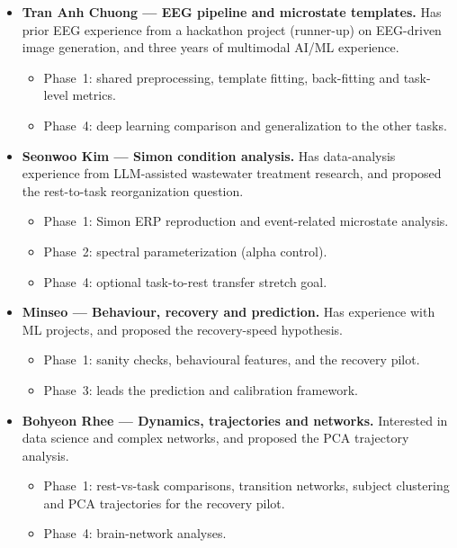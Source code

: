 \documentclass[11pt,a4paper]{article}
\begin{document}
\begin{itemize}
  \item \textbf{Tran Anh Chuong --- EEG pipeline and microstate templates.} Has prior EEG experience from a hackathon project (runner-up) on EEG-driven image generation, and three years of multimodal AI/ML experience.
  \begin{itemize}
    \item Phase~1: shared preprocessing, template fitting, back-fitting and task-level metrics.
    \item Phase~4: deep learning comparison and generalization to the other tasks.
  \end{itemize}
  \item \textbf{Seonwoo Kim --- Simon condition analysis.} Has data-analysis experience from LLM-assisted wastewater treatment research, and proposed the rest-to-task reorganization question.
  \begin{itemize}
    \item Phase~1: Simon ERP reproduction and event-related microstate analysis.
    \item Phase~2: spectral parameterization (alpha control).
    \item Phase~4: optional task-to-rest transfer stretch goal.
  \end{itemize}
  \item \textbf{Minseo --- Behaviour, recovery and prediction.} Has experience with ML projects, and proposed the recovery-speed hypothesis.
  \begin{itemize}
    \item Phase~1: sanity checks, behavioural features, and the recovery pilot.
    \item Phase~3: leads the prediction and calibration framework.
  \end{itemize}
  \item \textbf{Bohyeon Rhee --- Dynamics, trajectories and networks.} Interested in data science and complex networks, and proposed the PCA trajectory analysis.
  \begin{itemize}
    \item Phase~1: rest-vs-task comparisons, transition networks, subject clustering and PCA trajectories for the recovery pilot.
    \item Phase~4: brain-network analyses.
  \end{itemize}
\end{itemize}

\end{document}
